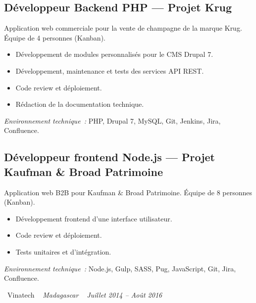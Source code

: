 \documentclass[10pt,a4paper]{article}
\begin{document}
\subsection*{Développeur Backend PHP --- Projet Krug}
\color{darkgray}
Application web commerciale pour la vente de champagne de la marque Krug. Équipe de 4 personnes (Kanban).
\begin{itemize}
  \item Développement de modules personnalisés pour le CMS Drupal 7.
  \item Développement, maintenance et tests des services API REST.
  \item Code review et déploiement.
  \item Rédaction de la documentation technique.
\end{itemize}
\textit{Environnement technique~:} PHP, Drupal 7, MySQL, Git, Jenkins, Jira, Confluence.

\vspace{6pt}

\subsection*{Développeur frontend Node.js --- Projet Kaufman \& Broad Patrimoine}
\color{darkgray}
Application web B2B pour Kaufman \& Broad Patrimoine. Équipe de 8 personnes (Kanban).
\begin{itemize}
  \item Développement frontend d'une interface utilisateur.
  \item Code review et déploiement.
  \item Tests unitaires et d'intégration.
\end{itemize}
\textit{Environnement technique~:} Node.js, Gulp, SASS, Pug, JavaScript, Git, Jira, Confluence.

\vspace{10pt}

\noindent\textcolor{primary}{ \faBuilding\ Vinatech} \quad
\textit{ \small \textcolor{darkgray}{ \faMapMarker\ } Madagascar } \hfill
\textit{ \small \textcolor{darkgray}{ \faCalendar\ } Juillet 2014 -- Août 2016 }

\vspace{4pt}
\end{document}
